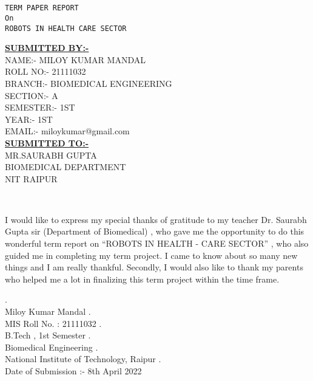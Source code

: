 \documentclass[12pt,a4paper]{report}
\begin{document}
 


\begin{center}
    \Large{}\\
\end{center}

\begin{center}
    \Large{}\\ 
\end{center}



\begin{center}
   \huge{\texttt{TERM PAPER REPORT\\On\\ROBOTS IN HEALTH CARE SECTOR}}
  \end{center}
 
  
\begin{center}
\textbf{\underline{SUBMITTED BY:-}}\\

NAME:- MILOY KUMAR MANDAL\\
ROLL NO:- 21111032\\
BRANCH:- BIOMEDICAL ENGINEERING\\
SECTION:- A\\
SEMESTER:- 1ST\\
YEAR:- 1ST\\
EMAIL:- miloykumar@gmail.com\\

\textbf{\underline{SUBMITTED TO:-}}\\
MR.SAURABH GUPTA\\
BIOMEDICAL DEPARTMENT\\
NIT RAIPUR\\


 
\end{center} 
\clearpage

\begin{center}
    \Large{}\\
\end{center}

I would like to express my special thanks of gratitude to my teacher Dr. Saurabh Gupta sir (Department of Biomedical) , who gave me the opportunity to do this wonderful term report on “ROBOTS IN HEALTH - CARE SECTOR” , who also guided me in completing my term project.
I came to know about so many new things and I am really thankful.
Secondly, I would also like to thank my parents who helped me a lot in finalizing this term project within the time frame.\par
.\\Miloy Kumar Mandal
.\\MIS Roll No. : 21111032
.\\B.Tech , 1st Semester
.\\Biomedical Engineering
.\\National Institute of Technology, Raipur
.\\Date of Submission :- 8th April 2022
\clearpage
\end{document}
